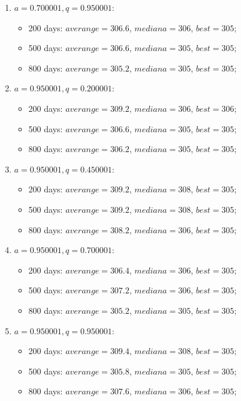 \begin{enumerate}
\begin{enumerate}
\begin{itemize}
		\end{itemize}
		\item $a= 0.700001, q= 0.950001$:
		\begin{itemize}
			\item 200 days: $averange = 306.6$, $mediana = 306$, $best = 305$;
			\item 500 days: $averange = 306.6$, $mediana = 305$, $best = 305$;
			\item 800 days: $averange = 305.2$, $mediana = 305$, $best = 305$;
		\end{itemize}
		\item $a= 0.950001, q= 0.200001$:
		\begin{itemize}
			\item 200 days: $averange = 309.2$, $mediana = 306$, $best = 306$;
			\item 500 days: $averange = 306.6$, $mediana = 305$, $best = 305$;
			\item 800 days: $averange = 306.2$, $mediana = 305$, $best = 305$;
		\end{itemize}
		\item $a= 0.950001, q= 0.450001$:
		\begin{itemize}
			\item 200 days: $averange = 309.2$, $mediana = 308$, $best = 305$;
			\item 500 days: $averange = 309.2$, $mediana = 308$, $best = 305$;
			\item 800 days: $averange = 308.2$, $mediana = 306$, $best = 305$;
		\end{itemize}
		\item $a= 0.950001, q= 0.700001$:
		\begin{itemize}
			\item 200 days: $averange = 306.4$, $mediana = 306$, $best = 305$;
			\item 500 days: $averange = 307.2$, $mediana = 306$, $best = 305$;
			\item 800 days: $averange = 305.2$, $mediana = 305$, $best = 305$;
		\end{itemize}
		\item $a= 0.950001, q= 0.950001$:
		\begin{itemize}
			\item 200 days: $averange = 309.4$, $mediana = 308$, $best = 305$;
			\item 500 days: $averange = 305.8$, $mediana = 305$, $best = 305$;
			\item 800 days: $averange = 307.6$, $mediana = 306$, $best = 305$;

\end{itemize}
\end{enumerate}
\end{enumerate}

